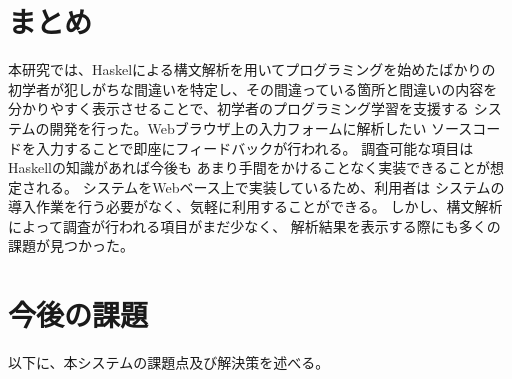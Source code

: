 \documentclass{csspaper}
\begin{document}
      \section{まとめ}
      本研究では、Haskelによる構文解析を用いてプログラミングを始めたばかりの
      初学者が犯しがちな間違いを特定し、その間違っている箇所と間違いの内容を
      分かりやすく表示させることで、初学者のプログラミング学習を支援する
      システムの開発を行った。Webブラウザ上の入力フォームに解析したい
      ソースコードを入力することで即座にフィードバックが行われる。
      調査可能な項目はHaskellの知識があれば今後も
      あまり手間をかけることなく実装できることが想定される。
      システムをWebベース上で実装しているため、利用者は
      システムの導入作業を行う必要がなく、気軽に利用することができる。
      しかし、構文解析によって調査が行われる項目がまだ少なく、
      解析結果を表示する際にも多くの課題が見つかった。

      \section{今後の課題}
      以下に、本システムの課題点及び解決策を述べる。
\end{document}
